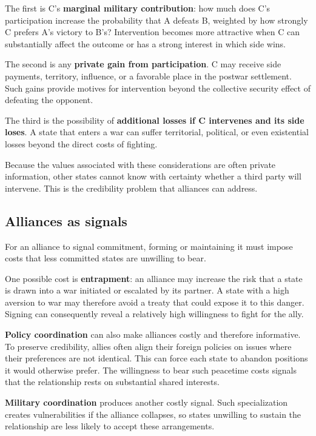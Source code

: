 The first is C's \textbf{marginal military contribution}: how much does C's participation increase the probability that A defeats B, weighted by how strongly C prefers A's victory to B's? Intervention becomes more attractive when C can substantially affect the outcome or has a strong interest in which side wins.

The second is any \textbf{private gain from participation}. C may receive side payments, territory, influence, or a favorable place in the postwar settlement. Such gains provide motives for intervention beyond the collective security effect of defeating the opponent.

The third is the possibility of \textbf{additional losses if C intervenes and its side loses}. A state that enters a war can suffer territorial, political, or even existential losses beyond the direct costs of fighting.

Because the values associated with these considerations are often private information, other states cannot know with certainty whether a third party will intervene. This is the credibility problem that alliances can address.

\subsection{Alliances as signals}
For an alliance to signal commitment, forming or maintaining it must impose costs that less committed states are unwilling to bear.

One possible cost is \textbf{entrapment}: an alliance may increase the risk that a state is drawn into a war initiated or escalated by its partner. A state with a high aversion to war may therefore avoid a treaty that could expose it to this danger. Signing can consequently reveal a relatively high willingness to fight for the ally.

\textbf{Policy coordination} can also make alliances costly and therefore informative. To preserve credibility, allies often align their foreign policies on issues where their preferences are not identical. This can force each state to abandon positions it would otherwise prefer. The willingness to bear such peacetime costs signals that the relationship rests on substantial shared interests.

\textbf{Military coordination} produces another costly signal. Such specialization creates vulnerabilities if the alliance collapses, so states unwilling to sustain the relationship are less likely to accept these arrangements.

